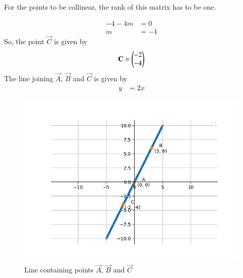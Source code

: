\documentclass[journal]{IEEEtran}
\begin{document}
For the points to be collinear, the rank of this matrix has to be one.

\begin{align}
	-4-4m &= 0\\
	m &= -1
\end{align}
So, the point $\vec{C}$ is given by
\begin{align}
	\mathbf{C} = \begin{pmatrix}-2\\-4\end{pmatrix}
\end{align}
The line joining $\vec{A}$, $\vec{B}$ and $\vec{C}$ is given by 
\begin{align}
	y &= 2x
\end{align}

\begin{figure}[h!]
   \centering
   \includegraphics[width=0.7\linewidth]{figs/graph.png}
   \caption{Line containing points $\vec{A}$, $\vec{B}$ and $\vec{C}$}
\end{figure}
\end{document}
